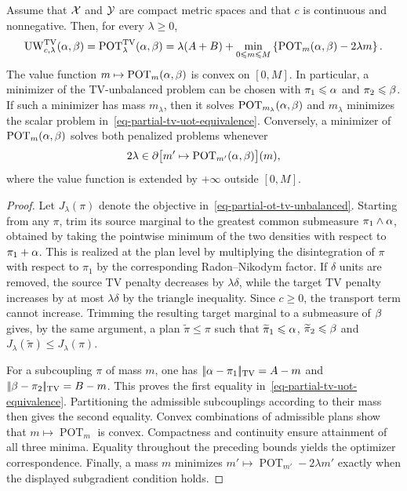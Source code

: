 \begin{prop}\label{prop-tv-partial-ot-lagrange}
Assume that $\mathcal{X}$ and $\mathcal{Y}$ are compact metric spaces and that $c$ is continuous and nonnegative. Then, for every $\lambda\geq0$,
\begin{equation}\label{eq-partial-tv-uot-equivalence}
\operatorname{UW}_{c,\lambda}^{\operatorname{TV}}(\alpha,\beta)
=
\operatorname{POT}^{\operatorname{TV}}_\lambda(\alpha,\beta)
=
\lambda(A+B)
+
\min_{0\leqslant m\leqslant M}
\left\{
\operatorname{POT}_m(\alpha,\beta)-2\lambda m
\right\}.
\end{equation}
The value function $m\mapsto\operatorname{POT}_m(\alpha,\beta)$ is convex on $[0,M]$. In particular, a minimizer of the TV-unbalanced problem can be chosen with $\pi_1\leqslant\alpha$ and $\pi_2\leqslant\beta$. If such a minimizer has mass $m_\lambda$, then it solves $\operatorname{POT}_{m_\lambda}(\alpha,\beta)$ and $m_\lambda$ minimizes the scalar problem in~\eqref{eq-partial-tv-uot-equivalence}. Conversely, a minimizer of $\operatorname{POT}_m(\alpha,\beta)$ solves both penalized problems whenever
\[
2\lambda\in\partial\bigl[m'\mapsto\operatorname{POT}_{m'}(\alpha,\beta)\bigr](m),
\]
where the value function is extended by $+\infty$ outside $[0,M]$.
\end{prop}

\begin{proof}
Let $J_\lambda(\pi)$ denote the objective in~\eqref{eq-partial-ot-tv-unbalanced}. Starting from any $\pi$, trim its source marginal to the greatest common submeasure $\pi_1\wedge\alpha$, obtained by taking the pointwise minimum of the two densities with respect to $\pi_1+\alpha$. This is realized at the plan level by multiplying the disintegration of $\pi$ with respect to $\pi_1$ by the corresponding Radon--Nikodym factor. If $\delta$ units are removed, the source TV penalty decreases by $\lambda\delta$, while the target TV penalty increases by at most $\lambda\delta$ by the triangle inequality. Since $c\geq0$, the transport term cannot increase. Trimming the resulting target marginal to a submeasure of $\beta$ gives, by the same argument, a plan $\widetilde\pi\leq\pi$ such that $\widetilde\pi_1\leqslant\alpha$, $\widetilde\pi_2\leqslant\beta$ and $J_\lambda(\widetilde\pi)\leq J_\lambda(\pi)$.

For a subcoupling $\pi$ of mass $m$, one has
\(|\!| \alpha-\pi_1 |\!|_{\operatorname{TV}}=A-m\) and \(|\!| \beta-\pi_2 |\!|_{\operatorname{TV}}=B-m\).
This proves the first equality in~\eqref{eq-partial-tv-uot-equivalence}. Partitioning the admissible subcouplings according to their mass then gives the second equality. Convex combinations of admissible plans show that $m\mapsto\operatorname{POT}_m$ is convex. Compactness and continuity ensure attainment of all three minima. Equality throughout the preceding bounds yields the optimizer correspondence. Finally, a mass $m$ minimizes $m'\mapsto\operatorname{POT}_{m'}-2\lambda m'$ exactly when the displayed subgradient condition holds.
\end{proof}

